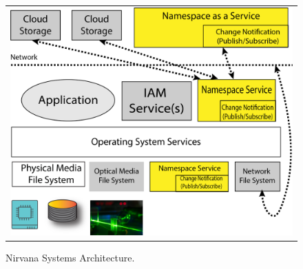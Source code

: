 



\begin{figure}[!tb]
    \centering
    \begin{tabular}{c}
        \includegraphics[width=0.95\columnwidth]{reference/hotos21/figures/nirvana-arch-8.png}
    \end{tabular}
    \caption{Nirvana Systems Architecture.}  %
    \label{fig:systemsarchitecture}
\end{figure}

